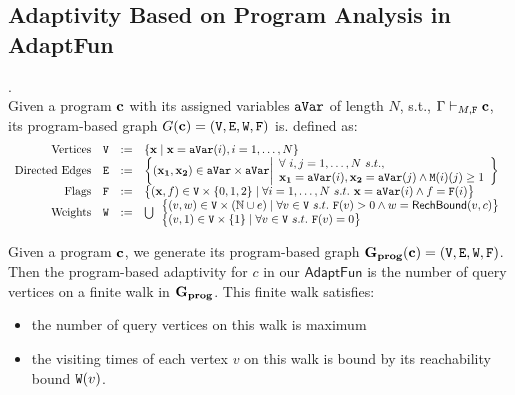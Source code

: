 \documentclass[a4paper,11pt]{article}
\newcommand{\THESYSTEM}{\textsf{AdaptFun}}
\begin{document}
\subsection{Adaptivity Based on Program Analysis in \THESYSTEM}
%
 \begin{defn}
.
\label{def:prog-based_graph}
\\
Given a program $\boldsymbol{\mathbf{c}}$ with its assigned variables $\mathtt{aVar}$ of length $N$, s.t.,
$\Gamma \vdash_{M, \mathtt{F}} \boldsymbol{\mathbf{c}}$, 
its program-based graph 
$G(\boldsymbol{\mathbf{c}}) = (\mathtt{V}, \mathtt{E}, \mathtt{W}, \mathtt{F})$ is. defined as:
\\
\[
\begin{array}{rlcl}
	\text{Vertices} &
	\vertxs & := & \left\{ 
	\ssa{x} \mid
	\ssa{x} = \avar(i), i = 1, \ldots, N 
	\right\}
	\\
	\text{Directed Edges} &
	\edges & := & 
	\left\{ 
	(\ssa{x_1}, \ssa{x_2}) 
	\in \avar \times \avar 
	\middle\vert
	\begin{array}{l}
		\forall ~ i,j = 1, \ldots, N ~ s.t., ~\\
		\ssa{x_1} = \avar(i),  \ssa{x_2} = \avar(j) \land
		\Mtrix(i)(j) \geq 1
	\end{array} 
	\right\}
	\\
	\text{Flags} &
	\flag & := & 
	\big\{(\ssa{x}, f)  \in \vertxs \times \{0, 1, 2\} 
	\mid 
	\forall i = 1, \ldots, N ~  s.t. ~
	\ssa{x} = \avar(i) \land f = \flag(i)
	\big\}
	\\
	\text{Weights} &
	\weights & := &
	\bigcup
	\begin{array}{l}
		\big\{ (v, w) \in \vertxs \times (\mathbb{N} \cup \expr)
		\mid
		\forall v \in \vertxs ~  s.t. ~ \flag(v) > 0 \land w = \rb(v, c)
		\big\} 
		\\
		\big\{(v, 1)  \in \vertxs \times \{1\} 
		\mid
		\forall v \in \vertxs ~  s.t. ~ \flag(v) = 0
		\big\}
	\end{array} 
\end{array}
\]
\end{defn} 
%
Given a program $\boldsymbol{\mathbf{c}}$, we generate its program-based graph 
$\mathtt{\bf{G_{prog}}}(\boldsymbol{\mathbf{c}}) = (\mathtt{V}, \mathtt{E}, \mathtt{W}, \mathtt{F})$.
%
Then the program-based adaptivity for $c$ in our $\THESYSTEM$ is the number of query vertices on a finite walk in $\mathtt{\bf{G_{prog}}}$. This finite walk satisfies:
\begin{itemize}
\item the number of query vertices on this walk is maximum
\item the visiting times of each vertex $v$ on this walk is bound by its reachability bound $\mathtt{W}(v)$.
\end{itemize}
\end{document}
